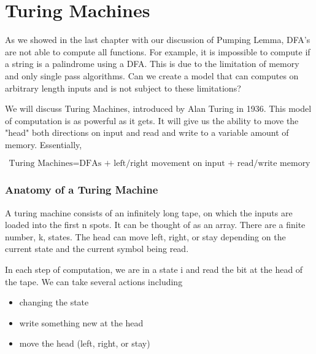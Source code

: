 \chapter{Turing Machines}

As we showed in the last chapter with our discussion of Pumping Lemma, DFA's are not able to compute all functions. For example, it is impossible to compute if a string is a palindrome using a DFA. This is due to the limitation of memory and only single pass algorithms. Can we create a model that can computes on arbitrary length inputs and is not subject to these limitations? 

We will discuss Turing Machines, introduced by Alan Turing in 1936. This model of computation is as powerful as it gets. It will give us the ability to move the "head" both directions on input and read and write to a variable amount of memory. Essentially,

\[
    \text{Turing Machines} = \text{DFAs + left/right movement on input + read/write memory}
\]

\subsection*{Anatomy of a Turing Machine}
A turing machine consists of an infinitely long tape, on which the inputs are loaded into the first n spots. It can be thought of as an array. There are a finite number, k, states. The head can move left, right, or stay depending on the current state and the current symbol being read. 

\begin{center}
\end{center}

In each step of computation, we are in a state i and read the bit at the head of the tape. We can take several actions including
\begin{itemize}
    \item changing the state
    \item write something new at the head 
    \item move the head (left, right, or stay)
\end{itemize}

